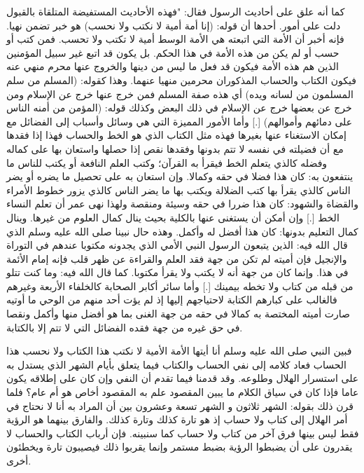  كما أنه علق على أحاديث الرسول فقال: "فهذه الأحاديث المستفيضة المتلقاة بالقبول دلت على أمور. أحدها أن قوله: (إنا أمة أمية لا نكتب ولا نحسب) هو خبر تضمن نهيا. فإنه أخبر أن الأمة التي اتبعته هي الأمة الوسط أمية لا تكتب ولا تحسب. فمن كتب أو حسب أو لم يكن من هذه الأمة في هذا الحكم. بل يكون قد اتبع غير سبيل المؤمنين الذين هم هذه الأمة فيكون قد فعل ما ليس من دينها والخروج عنها محرم منهي عنه فيكون الكتاب والحساب المذكوران محرمين منهيا عنهما. وهذا كقوله: (المسلم من سلم المسلمون من لسانه ويده) أي هذه صفة المسلم فمن خرج عنها خرج عن الإسلام ومن خرج عن بعضها خرج عن الإسلام في ذلك البعض وكذلك قوله: (المؤمن من أمنه الناس على دمائهم وأموالهم) [.] وأما الأمور المميزة التي هي وسائل وأسباب إلى الفضائل مع إمكان الاستغناء عنها بغيرها فهذه مثل الكتاب الذي هو الخط والحساب فهذا إذا فقدها مع أن فضيلته في نفسه لا تتم بدونها وفقدها نقص إذا حصلها واستعان بها على كماله وفضله كالذي يتعلم الخط فيقرأ به القرآن؛ وكتب العلم النافعة أو يكتب للناس ما ينتفعون به: كان هذا فضلا في حقه وكمالا. وإن استعان به على تحصيل ما يضره أو يضر الناس كالذي يقرأ بها كتب الضلالة ويكتب بها ما يضر الناس كالذي يزور خطوط الأمراء والقضاة والشهود: كان هذا ضررا في حقه وسيئة ومنقصة ولهذا نهى عمر أن تعلم النساء الخط [.] وإن أمكن أن يستغنى عنها بالكلية بحيث ينال كمال العلوم من غيرها. وينال كمال التعليم بدونها: كان هذا أفضل له وأكمل. وهذه حال نبينا صلى الله عليه وسلم الذي قال الله فيه: {الذين يتبعون الرسول النبي الأمي الذي يجدونه مكتوبا عندهم في التوراة والإنجيل} فإن أميته لم تكن من جهة فقد العلم والقراءة عن ظهر قلب فإنه إمام الأئمة في هذا. وإنما كان من جهة أنه لا يكتب ولا يقرأ مكتوبا. كما قال الله فيه: {وما كنت تتلو من قبله من كتاب ولا تخطه بيمينك} [.] وأما سائر أكابر الصحابة كالخلفاء الأربعة وغيرهم فالغالب على كبارهم الكتابة لاحتياجهم إليها إذ لم يؤت أحد منهم من الوحي ما أوتيه صارت أميته المختصة به كمالا في حقه من جهة الغنى بما هو أفضل منها وأكمل ونقصا في حق غيره من جهة فقده الفضائل التي لا تتم إلا بالكتابة.


فبين النبي صلى الله عليه وسلم أنا أيتها الأمة الأمية لا نكتب هذا الكتاب ولا نحسب هذا الحساب فعاد كلامه إلى نفي الحساب والكتاب فيما يتعلق بأيام الشهر الذي يستدل به على استسرار الهلال وطلوعه. وقد قدمنا فيما تقدم أن النفي وإن كان على إطلاقه يكون عاما فإذا كان في سياق الكلام ما يبين المقصود علم به المقصود أخاص هو أم عام؟ فلما قرن ذلك بقوله: {الشهر ثلاثون} و {الشهر تسعة وعشرون} بين أن المراد به أنا لا نحتاج في أمر الهلال إلى كتاب ولا حساب إذ هو تارة كذلك وتارة كذلك. والفارق بينهما هو الرؤية فقط ليس بينها فرق آخر من كتاب ولا حساب كما سنبينه. فإن أرباب الكتاب والحساب لا يقدرون على أن يضبطوا الرؤية بضبط مستمر وإنما يقربوا ذلك فيصيبون تارة ويخطئون أخرى.

